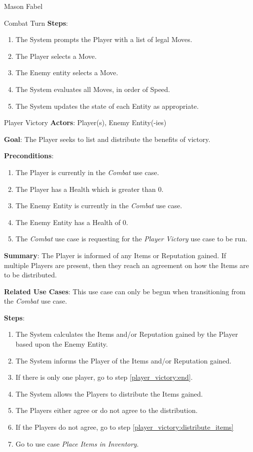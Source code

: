 \documentclass[12pt]{report}
\begin{document}
\begin{section}{Mason Fabel}
\begin{subsection}{Combat Turn}
\textbf{Steps}:
\begin{enumerate}
\item The System prompts the Player with a list of legal Moves.
\item The Player selects a Move.
\item The Enemy entity selects a Move.
\item The System evaluates all Moves, in order of Speed.
\item The System updates the state of each Entity as appropriate.
\end{enumerate}
\end{subsection}

\begin{subsection}{Player Victory}
\textbf{Actors}:
Player(s), Enemy Entity(-ies)

\textbf{Goal}:
The Player seeks to list and distribute the benefits of victory.

\textbf{Preconditions}:
\begin{enumerate}
\item The Player is currently in the \textit{Combat} use case.
\item The Player has a Health which is greater than 0.
\item The Enemy Entity is currently in the \textit{Combat} use case.
\item The Enemy Entity has a Health of 0.
\item The \textit{Combat} use case is requesting for the \textit{Player
	Victory} use case to be run.
\end{enumerate}

\textbf{Summary}:
The Player is informed of any Items or Reputation gained. If multiple
Players are present, then they reach an agreement on how the Items are to
be distributed.

\textbf{Related Use Cases}:
This use case can only be begun when transitioning from the \textit{Combat}
use case.

\textbf{Steps}:
\begin{enumerate}
\item The System calculates the Items and/or Reputation gained by the
	Player based upon the Enemy Entity.
\item The System informs the Player of the Items and/or Reputation gained.
\item If there is only one player, go to step \ref{player_victory:end}.
\item \label{player_victory:distribute_items} The System allows the Players
to distribute the Items gained.
\item The Players either agree or do not agree to the distribution.
\item If the Players do not agree,
	go to step \ref{player_victory:distribute_items}
\item \label{player_victory:end} Go to use case \textit{Place Items in
	Inventory}.
\end{enumerate}
\end{subsection}
\end{section}
\end{document}
